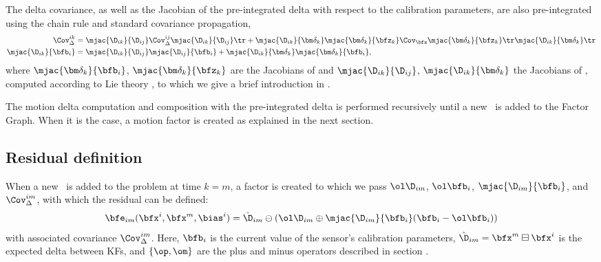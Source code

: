 The delta covariance, as well as the Jacobian of the pre-integrated delta with respect to the calibration parameters, are also pre-integrated using the chain rule and standard covariance propagation,
%
\begin{align}
    \Cov_\Delta^{ik} &= \mjac{\D_{ik}}{\D_{ij}}\Cov_\Delta^{ij}\mjac{\D_{ik}}{\D_{ij}}\tr 
    + \mjac{\D_{ik}}{\bm\delta_k}\mjac{\bm\delta_k}{\bfz_k}\Cov_\bfz\mjac{\bm\delta_k}{\bfz_k}\tr\mjac{\D_{ik}}{\bm\delta_k}\tr
    \\
    \mjac{\D_{ik}}{\bfb_i} &= \mjac{\D_{ik}}{\D_{ij}}\mjac{\D_{ij}}{\bfb_i} 
    + \mjac{\D_{ik}}{\bm\delta_k}\mjac{\bm\delta_k}{\bfb_i} ,
\end{align}
%
where $\mjac{\bm\delta_k}{\bfb_i}$, $\mjac{\bm\delta_k}{\bfz_k}$ are the Jacobians of  and $\mjac{\D_{ik}}{\D_{ij}}$, $\mjac{\D_{ik}}{\bm\delta_k}$ the Jacobians of , computed according to Lie theory \cite{sola2018micro}, to which we give a brief introduction in .

The motion delta computation and composition with the pre-integrated delta is performed recursively until a new \keyframe\ is added to the Factor Graph. When it 
is the case, a motion factor is created as explained in the next section.


\subsection{Residual definition}
\label{sec:preint_residual}

When a new \keyframe\ is added to the problem at time $k=m$,
a factor is created to which we pass $\ol\D_{im}$, $\ol\bfb_i$,  $\mjac{\D_{im}}{\bfb_i}$, and $\Cov_\Delta^{im}$, with which the residual can be defined:
%
%
\begin{align}
    \bfe_{im}(\bfx^i, \bfx^m, \bias^i) = \hat\D_{im} \ominus (\ol\D_{im} \oplus \mjac{\D_{im}}{\bfb_i}(\bfb_i-\ol\bfb_i) )  
    \label{eq:preint_residual}
\end{align}
%
with associated covariance $\Cov_\Delta^{im}$.
Here, $\bfb_i$ is the current  value of the sensor's calibration parameters,  $\hat\D_{im}=\bfx^m\boxminus\bfx^i$ is the expected delta between KFs, and $\{\op,\om\}$ are the 
 plus and minus operators described in section . 

